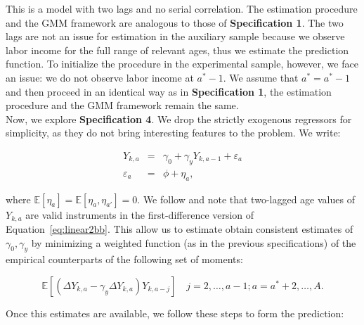 \noindent This is a model with two lags and no serial correlation. The estimation procedure and the GMM framework are analogous to those of \textbf{Specification 1}. The two lags are not an issue for estimation in the auxiliary sample because we observe labor income for the full range of relevant ages, thus we estimate the prediction function. To initialize the procedure in the experimental sample, however, we face an issue: we do not observe labor income at $a^* - 1$. We assume that $a^* = a^* - 1$ and then proceed in an identical way as in \textbf{Specification 1}, the estimation procedure and the GMM framework remain the same.\\

\noindent Now, we explore \textbf{Specification 4}. We drop the strictly exogenous regressors for simplicity, as they do not bring interesting features to the problem. We write:

\begin{eqnarray}
Y_{k,a} &=& \gamma_{0} + \gamma_{y} Y_{k,a-1} + \varepsilon_{a}\label{eq:linear1bb} \\
\varepsilon_{a} &=& \phi + \eta_{a}, \label{eq:linear2bb}
\end{eqnarray}
 
\noindent where $\mathbb{E}[\eta_{a}] = \mathbb{E}[\eta_{a}, \eta_{a'}] = 0$. We follow \citet{Arellano_1991_Some-Tests} and note that two-lagged age values of $Y_{k,a}$ are valid instruments in the first-difference version of Equation~\ref{eq:linear2bb}. This allow us to estimate obtain consistent estimates of $\gamma_{0}, \gamma_{y}$ by minimizing a weighted function (as in the previous specifications) of the empirical counterparts of the following set of moments: 

\begin{equation}
\mathbb{E} \left[ \left( \Delta Y_{k,a} -  \gamma_{y} \Delta Y_{k,a} \right)   Y_{k,a - j} \right] \quad j = 2, \ldots, a - 1; a = a^*+ 2, \ldots, A. \label{eq:abmoment}
\end{equation}

\noindent Once this estimates are available, we follow these steps to form the prediction:

